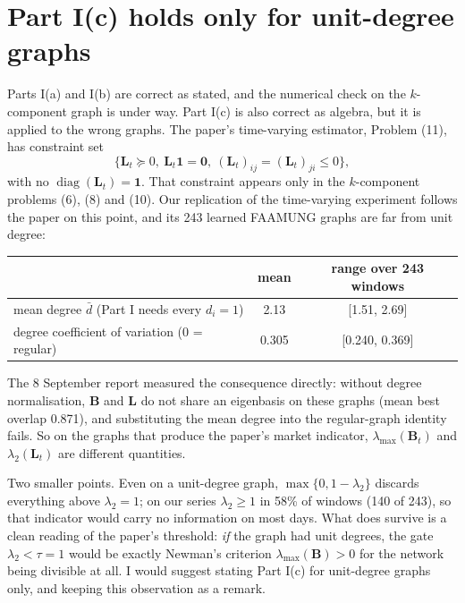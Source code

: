 \documentclass[11pt,a4paper]{article}
\newcommand{\Lap}{\mathbf{L}}
\newcommand{\Bmat}{\mathbf{B}}
\newcommand{\one}{\mathbf{1}}
\begin{document}
\section{Part I(c) holds only for unit-degree graphs}\label{sec:c}

Parts I(a) and I(b) are correct as stated, and the numerical check on the
$k$-component graph is under way. Part I(c) is also correct as algebra, but it is
applied to the wrong graphs. The paper's time-varying estimator, Problem (11), has
constraint set
\[
  \{\Lap_t\succeq 0,\ \Lap_t\one=\mathbf{0},\ (\Lap_t)_{ij}=(\Lap_t)_{ji}\le 0\},
\]
with no $\operatorname{diag}(\Lap_t)=\one$. That constraint appears only in the
$k$-component problems (6), (8) and (10). Our replication of the time-varying
experiment follows the paper on this point, and its 243 learned FAAMUNG graphs are
far from unit degree:

\begin{center}
\small
\begin{tabular}{lcc}
\toprule
 & mean & range over 243 windows \\
\midrule
mean degree $\bar d$ (Part I needs every $d_i=1$) & 2.13 & [1.51, 2.69] \\
degree coefficient of variation (0 = regular) & 0.305 & [0.240, 0.369] \\
\bottomrule
\end{tabular}
\end{center}

The 8 September report measured the consequence directly: without degree
normalisation, $\Bmat$ and $\Lap$ do not share an eigenbasis on these graphs (mean
best overlap 0.871), and substituting the mean degree into the regular-graph identity
fails. So on the graphs that produce the paper's market indicator,
$\lambda_{\max}(\Bmat_t)$ and $\lambda_2(\Lap_t)$ are different quantities.

Two smaller points. Even on a unit-degree graph, $\max\{0,1-\lambda_2\}$ discards
everything above $\lambda_2=1$; on our series $\lambda_2\ge 1$ in 58\% of windows
(140 of 243), so that indicator would carry no information on most days. What does
survive is a clean reading of the paper's threshold: \emph{if} the graph had unit
degrees, the gate $\lambda_2<\tau=1$ would be exactly Newman's criterion
$\lambda_{\max}(\Bmat)>0$ for the network being divisible at all. I would suggest
stating Part I(c) for unit-degree graphs only, and keeping this observation as a
remark.
\end{document}
